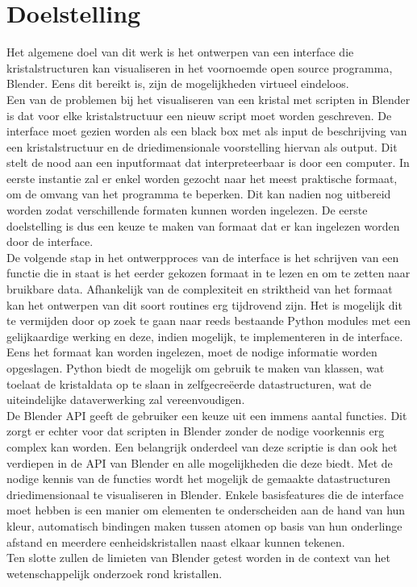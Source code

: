 \section{Doelstelling}
Het algemene doel van dit werk is het ontwerpen van een interface die kristalstructuren kan visualiseren in het voornoemde open source programma, Blender. Eens dit bereikt is, zijn de mogelijkheden virtueel eindeloos. 
\\
Een van de problemen bij het visualiseren van een kristal met scripten in Blender is dat voor elke kristalstructuur een nieuw script moet worden geschreven. De interface moet gezien worden als een black box met als input de beschrijving van een kristalstructuur en de driedimensionale voorstelling hiervan als output. Dit stelt de nood aan een inputformaat dat interpreteerbaar is door een computer. In eerste instantie zal er enkel worden gezocht naar het meest praktische formaat, om de omvang van het programma te beperken. Dit kan nadien nog uitbereid worden zodat verschillende formaten kunnen worden ingelezen. De eerste doelstelling is dus een keuze te maken van formaat dat er kan ingelezen worden door de interface.  
\\
De volgende stap in het ontwerpproces van de interface is het schrijven van een functie die in staat is het eerder gekozen formaat in te lezen en om te zetten naar bruikbare data. Afhankelijk van de complexiteit en striktheid van het formaat kan het ontwerpen van dit soort routines erg tijdrovend zijn. Het is mogelijk dit te vermijden door op zoek te gaan naar reeds bestaande Python modules met een gelijkaardige werking en deze, indien mogelijk, te implementeren in de interface. Eens het formaat kan worden ingelezen, moet de nodige informatie worden opgeslagen. Python biedt de mogelijk om gebruik te maken van klassen, wat toelaat de kristaldata op te slaan in zelfgecreëerde datastructuren, wat de uiteindelijke dataverwerking zal vereenvoudigen. 
\\
De Blender API geeft de gebruiker een keuze uit een immens aantal functies. Dit zorgt er echter voor dat scripten in Blender zonder de nodige voorkennis erg complex kan worden. Een belangrijk onderdeel van deze scriptie is dan ook het verdiepen in de API van Blender en alle mogelijkheden die deze biedt. Met de nodige kennis van de functies wordt het mogelijk de gemaakte datastructuren driedimensionaal te visualiseren in Blender. Enkele basisfeatures die de interface moet hebben is een manier om elementen te onderscheiden aan de hand van hun kleur, automatisch bindingen maken tussen atomen op basis van hun onderlinge afstand en meerdere eenheidskristallen naast elkaar kunnen tekenen.
\\
Ten slotte zullen de limieten van Blender getest worden in de context van het wetenschappelijk onderzoek rond kristallen.  


